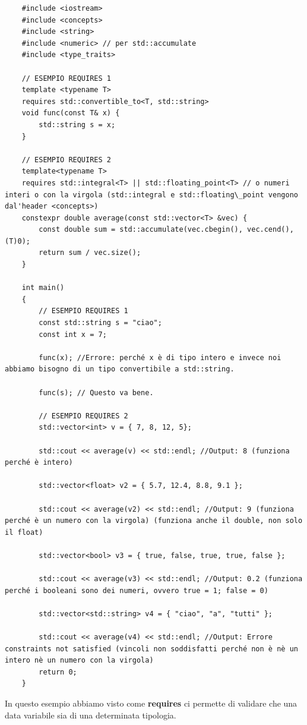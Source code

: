 \begin{lstlisting}
	#include <iostream>
	#include <concepts>
	#include <string>
	#include <numeric> // per std::accumulate
	#include <type_traits>
	
	// ESEMPIO REQUIRES 1
	template <typename T>
	requires std::convertible_to<T, std::string>
	void func(const T& x) {
		std::string s = x;
	}

	// ESEMPIO REQUIRES 2
	template<typename T>
	requires std::integral<T> || std::floating_point<T> // o numeri interi o con la virgola (std::integral e std::floating\_point vengono dal'header <concepts>)
	constexpr double average(const std::vector<T> &vec) {
		const double sum = std::accumulate(vec.cbegin(), vec.cend(), (T)0);        
		return sum / vec.size();
	}

	int main()
	{
		// ESEMPIO REQUIRES 1
		const std::string s = "ciao";
		const int x = 7;
		
		func(x); //Errore: perché x è di tipo intero e invece noi abbiamo bisogno di un tipo convertibile a std::string.
		
		func(s); // Questo va bene.
		
		// ESEMPIO REQUIRES 2
		std::vector<int> v = { 7, 8, 12, 5};
		
		std::cout << average(v) << std::endl; //Output: 8 (funziona perché è intero)
		
		std::vector<float> v2 = { 5.7, 12.4, 8.8, 9.1 };
		
		std::cout << average(v2) << std::endl; //Output: 9 (funziona perché è un numero con la virgola) (funziona anche il double, non solo il float)
		
		std::vector<bool> v3 = { true, false, true, true, false };
		
		std::cout << average(v3) << std::endl; //Output: 0.2 (funziona perché i booleani sono dei numeri, ovvero true = 1; false = 0)
		
		std::vector<std::string> v4 = { "ciao", "a", "tutti" };
		
		std::cout << average(v4) << std::endl; //Output: Errore constraints not satisfied (vincoli non soddisfatti perché non è nè un intero nè un numero con la virgola)
		return 0;
	}
\end{lstlisting}

\textsf{\small In questo esempio abbiamo visto come \textbf{requires} ci permette di validare che una data variabile sia di una determinata tipologia.} \\

